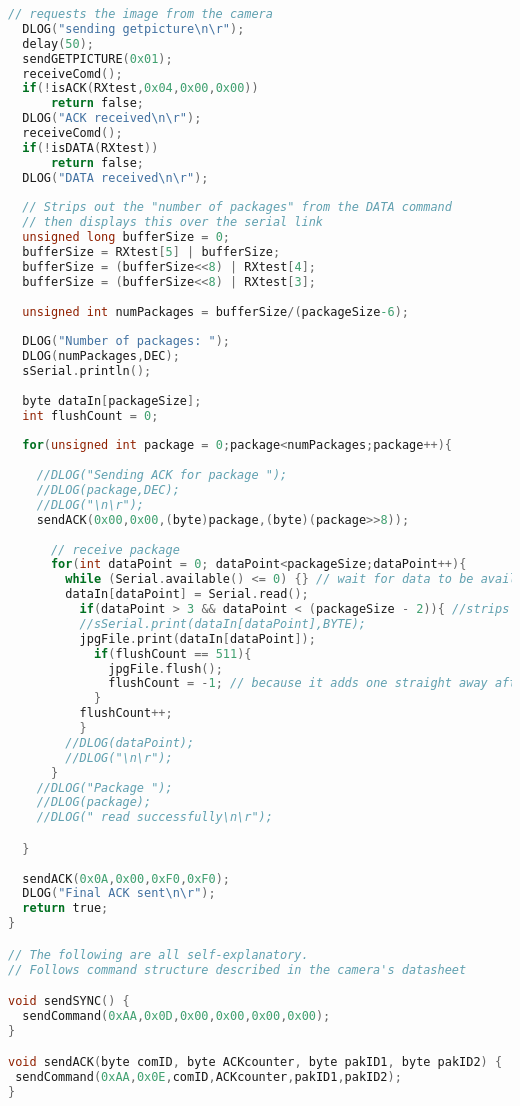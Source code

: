 \begin{lstlisting}[language=C, label = lst:arduino_captureTest, caption = {Arduino code, used up until the point we started using the Il Matto. This was written in the arduino-022 IDE}]
  // requests the image from the camera
  DLOG("sending getpicture\n\r");
  delay(50);
  sendGETPICTURE(0x01);
  receiveComd();
  if(!isACK(RXtest,0x04,0x00,0x00))
      return false;
  DLOG("ACK received\n\r");
  receiveComd();    
  if(!isDATA(RXtest))
      return false;
  DLOG("DATA received\n\r");
  
  // Strips out the "number of packages" from the DATA command
  // then displays this over the serial link  
  unsigned long bufferSize = 0;
  bufferSize = RXtest[5] | bufferSize;
  bufferSize = (bufferSize<<8) | RXtest[4];
  bufferSize = (bufferSize<<8) | RXtest[3];
  
  unsigned int numPackages = bufferSize/(packageSize-6);
  
  DLOG("Number of packages: ");
  DLOG(numPackages,DEC);
  sSerial.println();
  
  byte dataIn[packageSize];
  int flushCount = 0;
  
  for(unsigned int package = 0;package<numPackages;package++){
    
    //DLOG("Sending ACK for package ");
    //DLOG(package,DEC);
    //DLOG("\n\r");
    sendACK(0x00,0x00,(byte)package,(byte)(package>>8));
    
      // receive package
      for(int dataPoint = 0; dataPoint<packageSize;dataPoint++){
        while (Serial.available() <= 0) {} // wait for data to be available n.b. will wait forever...
        dataIn[dataPoint] = Serial.read();
          if(dataPoint > 3 && dataPoint < (packageSize - 2)){ //strips out header data
          //sSerial.print(dataIn[dataPoint],BYTE);
          jpgFile.print(dataIn[dataPoint]);
            if(flushCount == 511){
              jpgFile.flush();
              flushCount = -1; // because it adds one straight away after
            }
          flushCount++;
          }
        //DLOG(dataPoint);
        //DLOG("\n\r");
      }
    //DLOG("Package ");
    //DLOG(package);
    //DLOG(" read successfully\n\r");

  }
  
  sendACK(0x0A,0x00,0xF0,0xF0);
  DLOG("Final ACK sent\n\r");
  return true;
}

// The following are all self-explanatory.
// Follows command structure described in the camera's datasheet

void sendSYNC() {
  sendCommand(0xAA,0x0D,0x00,0x00,0x00,0x00);
}

void sendACK(byte comID, byte ACKcounter, byte pakID1, byte pakID2) {
 sendCommand(0xAA,0x0E,comID,ACKcounter,pakID1,pakID2);
}


\end{lstlisting}
